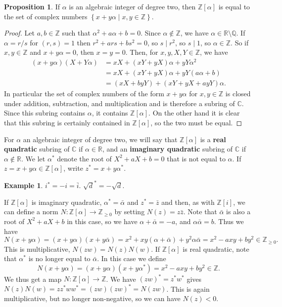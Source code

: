 \documentclass{article}
\newcommand{\Z}{\mathbb{Z}}
\newcommand{\Q}{\mathbb{Q}}
\newcommand{\R}{\mathbb{R}}
\newcommand{\C}{\mathbb{C}}
\newcommand{\rb}[1]{\left( #1 \right)}
\renewcommand{\sb}[1]{\left[ #1 \right]}
\newcommand{\cb}[1]{\left\{ #1 \right\}}
\theoremstyle{definition}\newtheorem{definition}{Definition}
\theoremstyle{definition}\newtheorem{remark}[definition]{Remark}
\theoremstyle{definition}\newtheorem*{example}{Example}
\theoremstyle{definition}\newtheorem*{note}{Note}
\newtheorem{proposition}[definition]{Proposition}
\begin{document}
\begin{proposition}
If $ \alpha $ is an algebraic integer of degree two, then $ \Z\sb{\alpha} $ is equal to the set of complex numbers $ \cb{x + y\alpha \mid x, y \in \Z} $.
\end{proposition}

\begin{proof}
Let $ a, b \in \Z $ such that $ \alpha^2 + a\alpha + b = 0 $. Since $ \alpha \notin \Z $, we have $ \alpha \in \R \setminus \Q $. If $ \alpha = r / s $ for $ \rb{r, s} = 1 $ then $ r^2 + ars + bs^2 = 0 $, so $ s \mid r^2 $, so $ s \mid 1 $, so $ \alpha \in \Z $. So if $ x, y \in \Z $ and $ x + y\alpha = 0 $, then $ x = y = 0 $. Then, for $ x, y, X, Y \in \Z $, we have
\begin{align*}
\rb{x + y\alpha}\rb{X + Y\alpha}
& = xX + \rb{xY + yX}\alpha + yY\alpha^2 \\
& = xX + \rb{xY + yX}\alpha + yY\rb{a\alpha + b} \\
& = \rb{xX + byY} + \rb{xY + yX + ayY}\alpha.
\end{align*}
In particular the set of complex numbers of the form $ x + y\alpha $ for $ x, y \in \Z $ is closed under addition, subtraction, and multiplication and is therefore a subring of $ \C $. Since this subring contains $ \alpha $, it contains $ \Z\sb{\alpha} $. On the other hand it is clear that this subring is certainly contained in $ \Z\sb{\alpha} $, so the two must be equal.
\end{proof}

For $ \alpha $ an algebraic integer of degree two, we will say that $ \Z\sb{\alpha} $ is a \textbf{real quadratic} subring of $ \C $ if $ \alpha \in \R $, and an \textbf{imaginary quadratic} subring of $ \C $ if $ \alpha \notin \R $. We let $ \alpha^* $ denote the root of $ X^2 + aX + b = 0 $ that is not equal to $ \alpha $. If $ z = x + y\alpha \in \Z\sb{\alpha} $, write $ z^* = x + y\alpha^* $.

\begin{example}
$ i^* = -i = \bar{i} $. $ \sqrt{d}^* = -\sqrt{d} $.
\end{example}

If $ \Z\sb{\alpha} $ is imaginary quadratic, $ \alpha^* = \bar{\alpha} $ and $ z^* = \bar{z} $ and then, as with $ \Z\sb{i} $, we can define a norm $ N : \Z\sb{\alpha} \to \Z_{\ge 0} $ by setting $ N\rb{z} = z\bar{z} $. Note that $ \bar{\alpha} $ is also a root of $ X^2 + aX + b $ in this case, so we have $ \alpha + \bar{\alpha} = -a $, and $ \alpha\bar{\alpha} = b $. Thus we have
$$ N\rb{x + y\alpha} = \rb{x + y\alpha}\rb{x + y\bar{\alpha}} = x^2 + xy\rb{\alpha + \bar{\alpha}} + y^2\alpha\bar{\alpha} = x^2 - axy + by^2 \in \Z_{\ge 0}. $$
This is multiplicative, $ N\rb{zw} = N\rb{z}N\rb{w} $. If $ \Z\sb{\alpha} $ is real quadratic, note that $ \alpha^* $ is no longer equal to $ \bar{\alpha} $. In this case we define
$$ N\rb{x + y\alpha} = \rb{x + y\alpha}\rb{x + y\alpha^*} = x^2 - axy + by^2 \in \Z. $$
We thus get a map $ N : \Z\sb{\alpha} \to \Z $. We have $ \rb{zw}^* = z^*w^* $ gives $ N\rb{z}N\rb{w} = zz^*ww^* = \rb{zw}\rb{zw}^* = N\rb{zw} $. This is again multiplicative, but no longer non-negative, so we can have $ N\rb{z} < 0 $.
\end{document}
